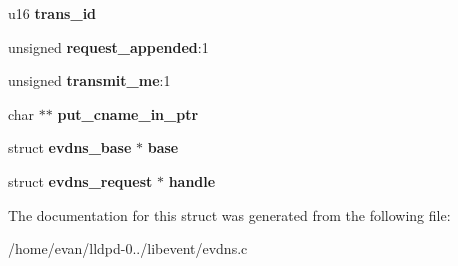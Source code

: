 \begin{DoxyCompactItemize}
\item 
u16 {\bfseries trans\-\_\-id}\label{structrequest_a84c6bbef770a9b5f8f7c33ce3842a436}

\item 
unsigned {\bfseries request\-\_\-appended}\-:1\label{structrequest_a6b6e0211566abdb38e16e675452b0c25}

\item 
unsigned {\bfseries transmit\-\_\-me}\-:1\label{structrequest_a2e05059396b9dc6734f06bfdd90063ca}

\item 
char $\ast$$\ast$ {\bfseries put\-\_\-cname\-\_\-in\-\_\-ptr}\label{structrequest_abd56310cee4988c86be1220fbb3f9863}

\item 
struct {\bf evdns\-\_\-base} $\ast$ {\bfseries base}\label{structrequest_a9284dcea4dc075146973bbcd063de32f}

\item 
struct {\bf evdns\-\_\-request} $\ast$ {\bfseries handle}\label{structrequest_aa0d67fca355c74d9fc9c5f87dc64b1ed}

\end{DoxyCompactItemize}


\-The documentation for this struct was generated from the following file\-:\begin{DoxyCompactItemize}
\item 
/home/evan/lldpd-\/0../libevent/evdns.\-c\end{DoxyCompactItemize}
